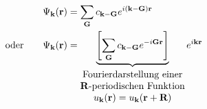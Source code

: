 \begin{itemize}
    \begin{align}
        \Psi_{\textbf{k}} (\textbf{r}) &= \sum_{\textbf{G}} c_{\textbf{k}-\textbf{G}} e^{i(\textbf{k}-\textbf{G}) \textbf{r}}\\
        \text{oder} \qquad \Psi_{\textbf{k}} (\textbf{r}) &= \underbrace{\left[\sum_{\textbf{G}} c_{\textbf{k}-\textbf{G}} e^{-i\textbf{G} \textbf{r}}\right]}_{
            \begin{matrix}
                \text{Fourierdarstellung einer} \\ \text{\textbf{R}-periodischen Funktion}\\
                u_{\textbf{k}} ( \textbf{r}) = u_{\textbf{k}} ( \textbf{r} + \textbf{R})
            \end{matrix}
        } e^{i \textbf{k} \textbf{r}}
    \end{align}
    

\end{itemize}
